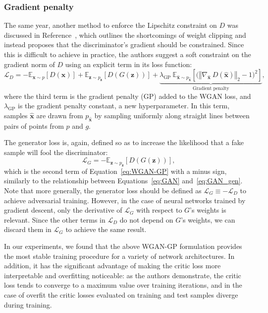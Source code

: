 \subsubsection{Gradient penalty}
The same year, another method to enforce the Lipschitz constraint on $D$ was
discussed in Reference~\cite{NIPS2017_892c3b1c}, which outlines the shortcomings
of weight clipping and instead proposes that the discriminator's gradient should
be constrained. Since this is difficult to achieve in practice, the authors
suggest a soft constraint on the gradient norm of $D$ using an explicit term in
its loss function:
\begin{equation}\label{eq:WGAN-GP}
    \mathcal{L}_D =
    -\mathbb{E}_{\bm{x} \sim p} \left[ D(\bm{x}) \right] +
    \mathbb{E}_{\bm{z} \sim p_{\bm{z}}} \left[ D(G(\bm{z})) \right] +
    \underbrace{\lambda_\mathrm{GP}\ \mathbb{E}_{\hat{\bm{x}} \sim p_{\hat{\bm{x}}}}
    \left[ \big( \left\Vert \nabla_{\hat{\bm{x}}}\ D(\hat{\bm{x}}) \right\Vert_2 - 1 \big) ^2 \right]}_\textrm{Gradient penalty},
\end{equation}
where the third term is the gradient penalty (GP) added to the WGAN loss, and
$\lambda_\mathrm{GP}$ is the gradient penalty constant, a new hyperparameter. In
this term, samples $\hat{\bm{x}}$ are drawn from $p_{\hat{\bm{x}}}$ by
sampling uniformly along straight lines between pairs of points from $p$ and
$g$.

The generator loss is, again, defined so as to increase the likelihood that a
fake sample will fool the discriminator:
\begin{equation}\label{eq:WGAN-GP_gen}
    \mathcal{L}_G =
    -\mathbb{E}_{\bm{z} \sim p_{\bm{z}}} \left[ D(G(\bm{z})) \right],
\end{equation}
which is the second term of Equation~\ref{eq:WGAN-GP} with a minus sign, similarly to
the relationship between Equations~\ref{eq:GAN} and~\ref{eq:GAN_gen}. Note that more
generally, the generator loss should be defined as $\mathcal{L}_G \equiv
-\mathcal{L}_D$ to achieve adversarial training. However, in the case of neural
networks trained by gradient descent, only the derivative of $\mathcal{L}_G$
with respect to $G$'s weights is relevant. Since the other terms in
$\mathcal{L}_D$ do not depend on $G$'s weights, we can discard them in
$\mathcal{L}_G$ to achieve the same result.

In our experiments, we found that the above WGAN-GP formulation provides the
most stable training procedure for a variety of network architectures. In
addition, it has the significant advantage of making the critic loss more
interpretable and overfitting noticeable: as the authors demonstrate, the critic
loss tends to converge to a maximum value over training iterations, and in the
case of overfit the critic losses evaluated on training and test samples
diverge during training.

